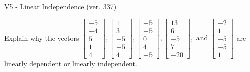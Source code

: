 \begin{exercise}
  \begin{exerciseTitle}V5 - Linear Independence (ver. 337)\end{exerciseTitle}
  \begin{exerciseStatement}
    Explain why the vectors \(\left[\begin{array}{r}
-5 \\
-4 \\
5 \\
1 \\
4
\end{array}\right] , \left[\begin{array}{r}
1 \\
3 \\
-5 \\
-5 \\
4
\end{array}\right] , \left[\begin{array}{r}
-5 \\
-5 \\
0 \\
4 \\
-5
\end{array}\right] , \left[\begin{array}{r}
13 \\
6 \\
-5 \\
7 \\
-20
\end{array}\right] , \text{ and } \left[\begin{array}{r}
-2 \\
1 \\
-5 \\
-5 \\
1
\end{array}\right]\) are linearly dependent or linearly independent.	



\end{exerciseStatement}
\end{exercise}
